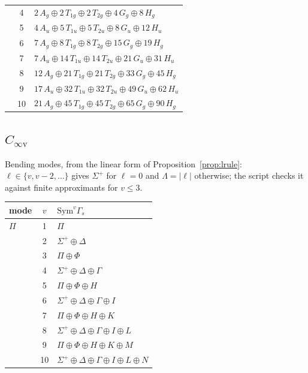 \documentclass[11pt]{article}
\begin{document}
\begin{longtable}{l c p{}}
 & 4 & $2\,A_{g}\oplus 2\,T_{1g}\oplus 2\,T_{2g}\oplus 4\,G_{g}\oplus 8\,H_{g}$\\
 & 5 & $4\,A_{u}\oplus 5\,T_{1u}\oplus 5\,T_{2u}\oplus 8\,G_{u}\oplus 12\,H_{u}$\\
 & 6 & $7\,A_{g}\oplus 8\,T_{1g}\oplus 8\,T_{2g}\oplus 15\,G_{g}\oplus 19\,H_{g}$\\
 & 7 & $7\,A_{u}\oplus 14\,T_{1u}\oplus 14\,T_{2u}\oplus 21\,G_{u}\oplus 31\,H_{u}$\\
 & 8 & $12\,A_{g}\oplus 21\,T_{1g}\oplus 21\,T_{2g}\oplus 33\,G_{g}\oplus 45\,H_{g}$\\
 & 9 & $17\,A_{u}\oplus 32\,T_{1u}\oplus 32\,T_{2u}\oplus 49\,G_{u}\oplus 62\,H_{u}$\\
 & 10 & $21\,A_{g}\oplus 45\,T_{1g}\oplus 45\,T_{2g}\oplus 65\,G_{g}\oplus 90\,H_{g}$\\
\hline
\end{longtable}

\subsection*{$C_{\infty\mathrm v}$}
Bending modes, from the linear form of Proposition~\ref{prop:lrule}: $\ell\in\{v,v-2,\ldots\}$ gives $\Sigma^+$ for $\ell=0$ and $\Lambda=|\ell|$ otherwise; the script checks it against finite approximants for $v\le3$.
\begin{longtable}{l c p{}}
\hline mode & $v$ & $\mathrm{Sym}^v\Gamma_s$\\ \hline\endhead
$\Pi$ & 1 & $\Pi$\\
 & 2 & $\Sigma^{+}\oplus \Delta$\\
 & 3 & $\Pi\oplus \Phi$\\
 & 4 & $\Sigma^{+}\oplus \Delta\oplus \Gamma$\\
 & 5 & $\Pi\oplus \Phi\oplus H$\\
 & 6 & $\Sigma^{+}\oplus \Delta\oplus \Gamma\oplus I$\\
 & 7 & $\Pi\oplus \Phi\oplus H\oplus K$\\
 & 8 & $\Sigma^{+}\oplus \Delta\oplus \Gamma\oplus I\oplus L$\\
 & 9 & $\Pi\oplus \Phi\oplus H\oplus K\oplus M$\\
 & 10 & $\Sigma^{+}\oplus \Delta\oplus \Gamma\oplus I\oplus L\oplus N$\\
\hline
\end{longtable}
\end{document}
